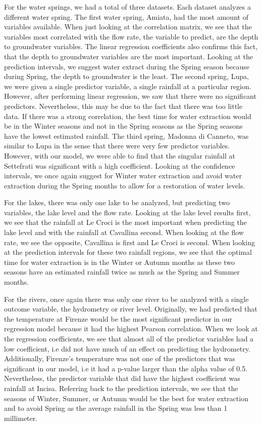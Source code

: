 \documentclass[12pt, letterpaper]{article}
\begin{document}
For the water springs, we had a total of three datasets. Each dataset analyzes a different water spring. The first water spring, Amiata, had the most amount of variables available. When just looking at the correlation matrix, we see that the variables most correlated with the flow rate, the variable to predict, are the depth to groundwater variables. The linear regression coefficients also confirms this fact, that the depth to groundwater variables are the most important. Looking at the prediction intervals, we suggest water extract during the Spring season because during Spring, the depth to groundwater is the least. The second spring, Lupa, we were given a single predictor variable, a single rainfall at a particular region. However, after performing linear regression, we saw that there were no significant predictors. Nevertheless, this may be due to the fact that there was too little data. If there was a strong correlation, the best time for water extraction would be in the Winter seasons and not in the Spring seasons as the Spring seasons have the lowest estimated rainfall. The third spring, Madonna di Canneto, was similar to Lupa in the sense that there were very few predictor variables. However, with our model, we were able to find that the singular rainfall at Settefrati was significant with a high coefficient. Looking at the confidence intervals, we once again suggest for Winter water extraction and avoid water extraction during the Spring months to allow for a restoration of water levels. 

For the lakes, there was only one lake to be analyzed, but predicting two variables, the lake level and the flow rate. Looking at the lake level results first, we see that the rainfall at Le Croci is the most important when predicting the lake level and with the rainfall at Cavallina second. When looking at the flow rate, we see the opposite, Cavallina is first and Le Croci is second. When looking at the prediction intervals for these two rainfall regions, we see that the optimal time for water extraction is in the Winter or Autumn months as these two seasons have an estimated rainfall twice as much as the Spring and Summer months. 

For the rivers, once again there was only one river to be analyzed with a single outcome variable, the hydrometry or river level. Originally, we had predicted that the temperature at Firenze would be the most significant predictor in our regression model because it had the highest Pearson correlation. When we look at the regression coefficients, we see that almost all of the predictor variables had a low coefficient, i.e did not have much of an effect on predicting the hydrometry. Additionally, Firenze’s temperature was not one of the predictors that was significant in our model, i.e it had a p-value larger than the alpha value of 0.5. Nevertheless, the predictor variable that did have the highest coefficient was rainfall at Incisa. Referring back to the prediction intervals, we see that the seasons of Winter, Summer, or Autumn would be the best for water extraction and to avoid Spring as the average rainfall in the Spring was less than 1 millimeter. 
\end{document}
